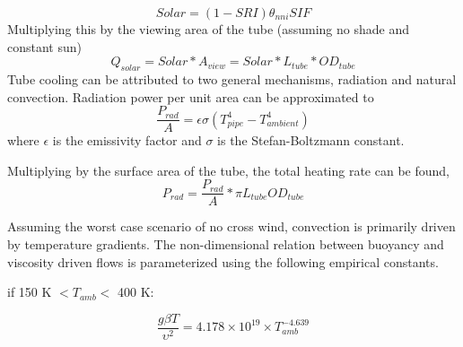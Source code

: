 \documentclass[heading.tex]{subfiles}
\begin{document}

\begin{equation*}
Solar = (1-SRI) {\theta}_{nni} SIF
\end{equation*}
Multiplying this by the viewing area of the tube (assuming no shade and constant sun)
\begin{equation*}
Q_{solar} = Solar * A_{view} = Solar * L_{tube} * OD_{tube}
\end{equation*}
Tube cooling can be attributed to two general mechanisms, radiation and natural convection. Radiation power per unit area can be
approximated to
\begin{equation*}
\frac{P_{rad}}{A} = \epsilon \sigma (T_{pipe}^4 - T_{ambient}^4)
\end{equation*}
where  $\epsilon$ is the emissivity factor and  $\sigma$ is the Stefan-Boltzmann constant.

Multiplying by the surface area of the tube, the total heating rate can be found,
\begin{equation*}
P_{rad} =  \frac{P_{rad}}{A} * \pi L_{tube} OD_{tube}
\end{equation*}

Assuming the worst case scenario of no cross wind, convection is primarily driven by temperature gradients. The non-dimensional relation
between buoyancy and viscosity driven flows is parameterized using the following empirical constants. \cite{Berton} \cite{Incropera}

if 150 K $<  T_{amb} <$ 400 K:


\begin{equation*}
\frac{g \beta T} {\upsilon^2} =  4.178\times10^{19} \times T_{amb}^{-4.639}
\end{equation*}
\end{document}
